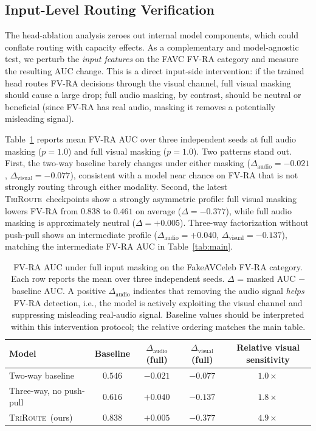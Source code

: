 \documentclass{article}
\newcommand{\method}{\textsc{TriRoute}}
\begin{document}
\subsection{Input-Level Routing Verification}

The head-ablation analysis zeroes out internal model components, which could conflate routing with capacity effects. As a complementary and model-agnostic test, we perturb the \emph{input features} on the FAVC FV-RA category and measure the resulting AUC change. This is a direct input-side intervention: if the trained head routes FV-RA decisions through the visual channel, full visual masking should cause a large drop; full audio masking, by contrast, should be neutral or beneficial (since FV-RA has real audio, masking it removes a potentially misleading signal).

Table~\ref{tab:perturbation} reports mean FV-RA AUC over three independent seeds at full audio masking ($p=1.0$) and full visual masking ($p=1.0$). Two patterns stand out. First, the two-way baseline barely changes under either masking ($\Delta_{\mathrm{audio}}=-0.021$, $\Delta_{\mathrm{visual}}=-0.077$), consistent with a model near chance on FV-RA that is not strongly routing through either modality. Second, the latest \method\ checkpoints show a strongly asymmetric profile: full visual masking lowers FV-RA from $0.838$ to $0.461$ on average ($\Delta=-0.377$), while full audio masking is approximately neutral ($\Delta=+0.005$). Three-way factorization without push-pull shows an intermediate profile ($\Delta_{\mathrm{audio}}=+0.040$, $\Delta_{\mathrm{visual}}=-0.137$), matching the intermediate FV-RA AUC in Table~\ref{tab:main}.

\begin{table}[t]
    \centering
    \caption{FV-RA AUC under full input masking on the FakeAVCeleb FV-RA category. Each row reports the mean over three independent seeds. $\Delta$ = masked AUC $-$ baseline AUC. A positive $\Delta_{\mathrm{audio}}$ indicates that removing the audio signal \emph{helps} FV-RA detection, i.e., the model is actively exploiting the visual channel and suppressing misleading real-audio signal. Baseline values should be interpreted within this intervention protocol; the relative ordering matches the main table.}
    \label{tab:perturbation}
    \small
    \begin{tabular}{lcccc}
        \toprule
        Model & Baseline & $\Delta_{\mathrm{audio}}$ (full) & $\Delta_{\mathrm{visual}}$ (full) & Relative visual sensitivity \\
        \midrule
        Two-way baseline        & $0.546$ & $-0.021$ & $-0.077$ & $1.0\times$ \\
        Three-way, no push-pull & $0.616$ & $+0.040$ & $-0.137$ & $1.8\times$ \\
        \method\ (ours) & $\mathbf{0.838}$ & $\mathbf{+0.005}$ & $\mathbf{-0.377}$ & $\mathbf{4.9\times}$ \\
        \bottomrule
    \end{tabular}
\end{table}
\end{document}
